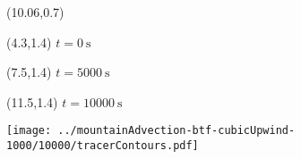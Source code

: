 \documentclass{article}
\begin{document}
\TPMargin{1pt}
\begin{textblock}{0.75}(10.06,0.7)
\end{textblock}
\begin{textblock}{4}(4.3,1.4)
\normalsize
$t = \SI{0}{\second}$
\end{textblock}
\begin{textblock}{4}(7.5,1.4)
\normalsize
$t = \SI{5000}{\second}$
\end{textblock}
\begin{textblock}{4}(11.5,1.4)
\normalsize
$t = \SI{10000}{\second}$
\end{textblock}
\centering
\texttt{[image: ../mountainAdvection-btf-cubicUpwind-1000/10000/tracerContours.pdf]}
\end{document}
